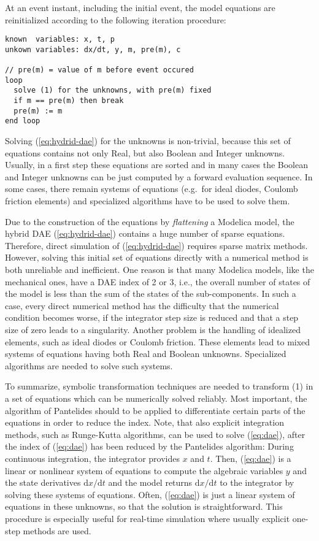 At an event instant, including the initial event, the model equations
are reinitialized according to the following iteration procedure:
\begin{lstlisting}[language=modelica]
known  variables: x, t, p
unkown variables: dx/dt, y, m, pre(m), c

// pre(m) = value of m before event occured
loop
  solve (1) for the unknowns, with pre(m) fixed
  if m == pre(m) then break
  pre(m) := m
end loop
\end{lstlisting}
Solving (\ref{eq:hydrid-dae}) for the unknowns is non-trivial, because this set of
equations contains not only Real, but also Boolean and Integer unknowns.
Usually, in a first step these equations are sorted and in many cases
the Boolean and Integer unknowns can be just computed by a forward
evaluation sequence. In some cases, there remain systems of equations
(e.g.\ for ideal diodes, Coulomb friction elements) and specialized
algorithms have to be used to solve them.

Due to the construction of the equations by \emph{flattening} a Modelica
model, the hybrid DAE (\ref{eq:hydrid-dae}) contains a huge number of sparse equations.
Therefore, direct simulation of (\ref{eq:hydrid-dae}) requires sparse matrix methods.
However, solving this initial set of equations directly with a numerical
method is both unreliable and inefficient. One reason is that many
Modelica models, like the mechanical ones, have a DAE index of 2 or 3,
i.e., the overall number of states of the model is less than the sum of
the states of the sub-components. In such a case, every direct numerical
method has the difficulty that the numerical condition becomes worse, if
the integrator step size is reduced and that a step size of zero leads
to a singularity. Another problem is the handling of idealized elements,
such as ideal diodes or Coulomb friction. These elements lead to mixed
systems of equations having both Real and Boolean unknowns. Specialized
algorithms are needed to solve such systems.

To summarize, symbolic transformation techniques are needed to transform
(1) in a set of equations which can be numerically solved reliably. Most
important, the algorithm of Pantelides should to be applied to
differentiate certain parts of the equations in order to reduce the
index. Note, that also explicit integration methods, such as Runge-Kutta
algorithms, can be used to solve (\ref{eq:dae}), after the index of (\ref{eq:dae}) has been
reduced by the Pantelides algorithm: During continuous integration, the
integrator provides $x$ and $t$. Then, (\ref{eq:dae}) is a linear or nonlinear system
of equations to compute the algebraic variables $y$ and the state
derivatives $\mathrm{d}x/\mathrm{d}t$ and the model returns $\mathrm{d}x/\mathrm{d}t$ to the integrator by
solving these systems of equations. Often, (\ref{eq:dae}) is just a linear system
of equations in these unknowns, so that the solution is straightforward.
This procedure is especially useful for real-time simulation where
usually explicit one-step methods are used.
